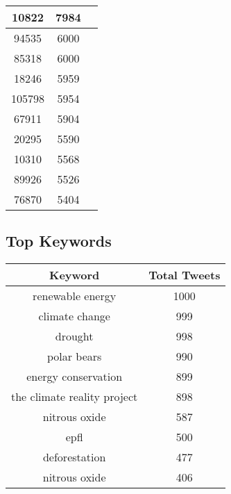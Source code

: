 \documentclass{article}\usepackage[T1]{fontenc}
\begin{document}
\begin{tabular}{|c|c|c|}
 \hline
10822 & 7984\\ 
 \hline
94535 & 6000\\ 
 \hline
85318 & 6000\\ 
 \hline
18246 & 5959\\ 
 \hline
105798 & 5954\\ 
 \hline
67911 & 5904\\ 
 \hline
20295 & 5590\\ 
 \hline
10310 & 5568\\ 
 \hline
89926 & 5526\\ 
 \hline
76870 & 5404\\ 
 \hline
\end{tabular}\subsection*{Top Keywords}\begin{tabular}{|c|c|}         \hline         Keyword & Total Tweets \\ 
 \hline
renewable energy & 1000\\ 
 \hline
climate change & 999\\ 
 \hline
drought & 998\\ 
 \hline
polar bears & 990\\ 
 \hline
energy conservation & 899\\ 
 \hline
the climate reality project & 898\\ 
 \hline
nitrous oxide & 587\\ 
 \hline
epfl & 500\\ 
 \hline
deforestation & 477\\ 
 \hline
nitrous oxide & 406\\ 
 \hline
\end{tabular}
\end{document}
